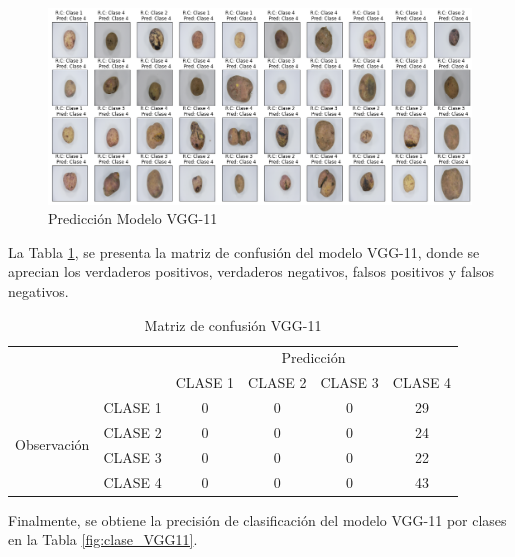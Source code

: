 			\begin{figure}[ht]
				\centering
				\includegraphics[scale=0.4]{Figs/107.png}
				\caption{Predicción Modelo VGG-11}
				\label{fig:Pre_VGG11}
			\end{figure}
			
			La Tabla \ref{fig:MC_VGG11}, se presenta la matriz de confusión del modelo VGG-11, donde se aprecian los verdaderos positivos, verdaderos negativos, falsos positivos y falsos negativos.
			
			\newpage
			\begin{table}[htbp]
				\centering
				\begin{tabular}{|c|l|c|c|c|c|}
					\hline
					\multicolumn{2}{|c|}{\multirow{2}[4]{*}{}} & \multicolumn{4}{c|}{Predicción} \bigstrut\\
					\cline{3-6}    \multicolumn{2}{|c|}{} & CLASE 1 & CLASE 2 & CLASE 3 & CLASE 4 \bigstrut\\
					\hline
					\multirow{4}[8]{*}{\begin{sideways}Observación\end{sideways}} & CLASE 1 & 0     & 0     & 0    & 29 \bigstrut\\
					\cline{2-6}     & CLASE 2 & 0     & 0     & 0    & 24 \bigstrut\\
					\cline{2-6}      & CLASE 3 & 0     & 0     & 0    & 22 \bigstrut\\
					\cline{2-6}     & CLASE 4 & 0     & 0     & 0    & 43 \bigstrut\\
					\hline
				\end{tabular}%
				\caption{Matriz de confusión VGG-11}
				\label{fig:MC_VGG11}
			\end{table}%
						
			Finalmente, se obtiene la precisión de clasificación del modelo VGG-11 por clases en la Tabla \ref{fig:clase_VGG11}.
			
